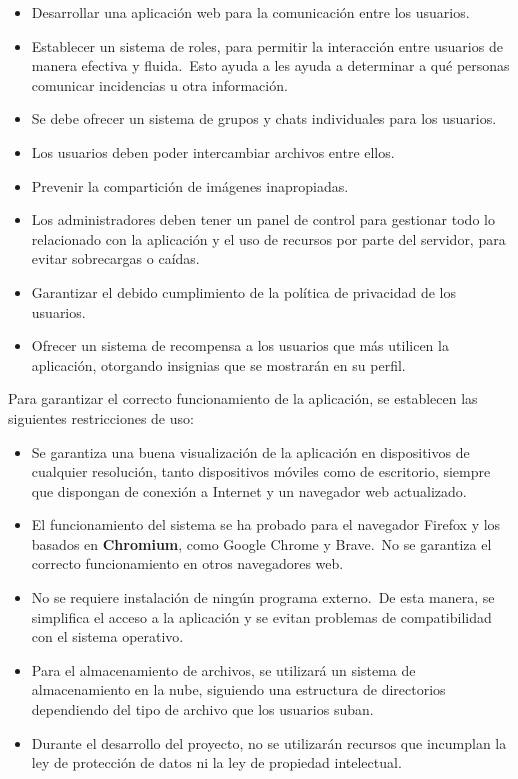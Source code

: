 \begin{itemize}
	\item Desarrollar una aplicación web para la comunicación entre los usuarios.
	\item Establecer un sistema de roles, para permitir la interacción entre usuarios de manera
	efectiva y fluida.\ Esto ayuda a les ayuda a determinar a qué personas comunicar incidencias u otra
	información.
	\item Se debe ofrecer un sistema de grupos y chats individuales para los usuarios.
	\item Los usuarios deben poder intercambiar archivos entre ellos.
	\item Prevenir la compartición de imágenes inapropiadas.
	\item Los administradores deben tener un panel de control para gestionar todo lo relacionado con la aplicación
	y el uso de recursos por parte del servidor, para evitar sobrecargas o caídas.
	\item Garantizar el debido cumplimiento de la política de privacidad de los usuarios.
	\item Ofrecer un sistema de recompensa a los usuarios que más utilicen la aplicación, otorgando insignias
	que se mostrarán en su perfil.
\end{itemize}
\label{itm:alcance_objetivos}


Para garantizar el correcto funcionamiento de la aplicación, se establecen las siguientes restricciones de uso:

\begin{itemize}
	\item Se garantiza una buena visualización de la aplicación en dispositivos de cualquier resolución, tanto
	dispositivos móviles como de escritorio, siempre que dispongan de conexión a Internet y un navegador web
	actualizado.
	\item El funcionamiento del sistema se ha probado para el navegador Firefox y los basados en \textbf{Chromium},
	como Google Chrome y Brave.\ No se garantiza el correcto funcionamiento en otros navegadores web.
	\item No se requiere instalación de ningún programa externo.\ De esta manera, se
	simplifica el acceso a la aplicación y se evitan problemas de compatibilidad con el sistema operativo.
	\item Para el almacenamiento de archivos, se utilizará un sistema de almacenamiento en la nube, siguiendo
	una estructura de directorios dependiendo del tipo de archivo que los usuarios suban.
	\item Durante el desarrollo del proyecto, no se utilizarán recursos que incumplan la ley de protección de
	datos ni la ley de propiedad intelectual.
\end{itemize}
\label{itm:alcance_limitaciones}

